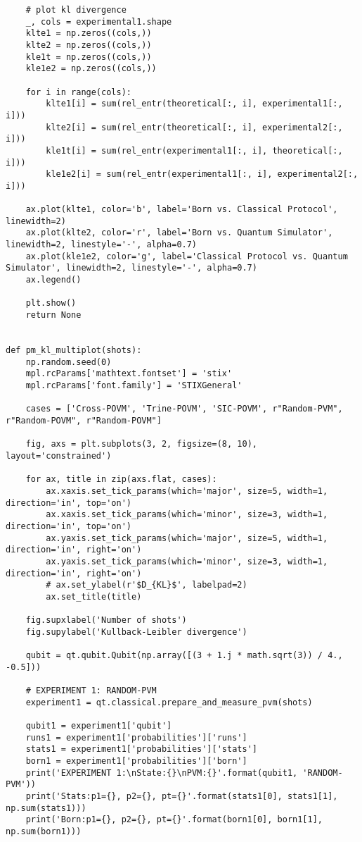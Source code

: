 \begin{verbatim}
    # plot kl divergence
    _, cols = experimental1.shape
    klte1 = np.zeros((cols,))
    klte2 = np.zeros((cols,))
    kle1t = np.zeros((cols,))
    kle1e2 = np.zeros((cols,))

    for i in range(cols):
        klte1[i] = sum(rel_entr(theoretical[:, i], experimental1[:, i]))
        klte2[i] = sum(rel_entr(theoretical[:, i], experimental2[:, i]))
        kle1t[i] = sum(rel_entr(experimental1[:, i], theoretical[:, i]))
        kle1e2[i] = sum(rel_entr(experimental1[:, i], experimental2[:, i]))

    ax.plot(klte1, color='b', label='Born vs. Classical Protocol', linewidth=2)
    ax.plot(klte2, color='r', label='Born vs. Quantum Simulator', linewidth=2, linestyle='-', alpha=0.7)
    ax.plot(kle1e2, color='g', label='Classical Protocol vs. Quantum Simulator', linewidth=2, linestyle='-', alpha=0.7)
    ax.legend()

    plt.show()
    return None


def pm_kl_multiplot(shots):
    np.random.seed(0)
    mpl.rcParams['mathtext.fontset'] = 'stix'
    mpl.rcParams['font.family'] = 'STIXGeneral'

    cases = ['Cross-POVM', 'Trine-POVM', 'SIC-POVM', r"Random-PVM", r"Random-POVM", r"Random-POVM"]

    fig, axs = plt.subplots(3, 2, figsize=(8, 10), layout='constrained')

    for ax, title in zip(axs.flat, cases):
        ax.xaxis.set_tick_params(which='major', size=5, width=1, direction='in', top='on')
        ax.xaxis.set_tick_params(which='minor', size=3, width=1, direction='in', top='on')
        ax.yaxis.set_tick_params(which='major', size=5, width=1, direction='in', right='on')
        ax.yaxis.set_tick_params(which='minor', size=3, width=1, direction='in', right='on')
        # ax.set_ylabel(r'$D_{KL}$', labelpad=2)
        ax.set_title(title)

    fig.supxlabel('Number of shots')
    fig.supylabel('Kullback-Leibler divergence')

    qubit = qt.qubit.Qubit(np.array([(3 + 1.j * math.sqrt(3)) / 4., -0.5]))

    # EXPERIMENT 1: RANDOM-PVM
    experiment1 = qt.classical.prepare_and_measure_pvm(shots)

    qubit1 = experiment1['qubit']
    runs1 = experiment1['probabilities']['runs']
    stats1 = experiment1['probabilities']['stats']
    born1 = experiment1['probabilities']['born']
    print('EXPERIMENT 1:\nState:{}\nPVM:{}'.format(qubit1, 'RANDOM-PVM'))
    print('Stats:p1={}, p2={}, pt={}'.format(stats1[0], stats1[1], np.sum(stats1)))
    print('Born:p1={}, p2={}, pt={}'.format(born1[0], born1[1], np.sum(born1)))


\end{verbatim}

